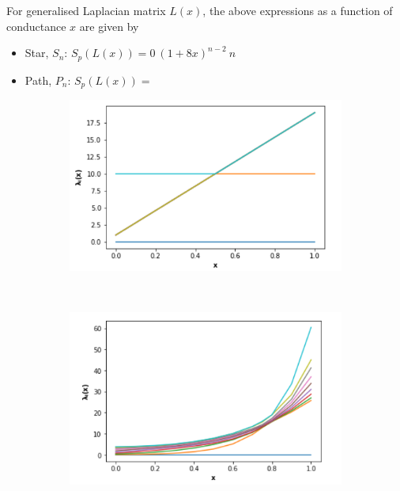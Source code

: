 \documentclass[10pt,a4paper]{article}
\begin{document}
    	    	 For generalised Laplacian matrix $L(x)$, the above expressions as a function of conductance $x$ are given by
    	    	 \begin{itemize}
    	    	 	\item Star, $S_n$: $S_p(L(x)) = {0~ (1+8x)^{n-2}~ n}$\\
    	    	 	\item Path, $P_n$: $S_p(L(x)) = { }$
    	    	 \end{itemize}
    	    	 \begin{figure}[H]
    	    	 	\centering
    	    	 	\begin{subfigure}[b]{0.45\textwidth}
    	    	 		\includegraphics[width= \textwidth]{images/Star-network-eigenplot.png}
    	    	 		\label{star-spectra}
    	    	 	\end{subfigure}~
    	    	 	\begin{subfigure}[b]{0.45\textwidth}
    	    	 		\includegraphics[width= \textwidth]{images/Path-network-eigenplot.png}

\end{subfigure}
\end{figure}
\end{document}
